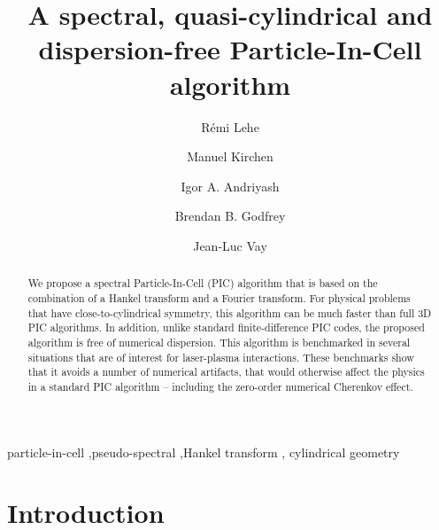\documentclass[1p,times]{elsarticle}
\title{A spectral, quasi-cylindrical and dispersion-free Particle-In-Cell algorithm}
\author[label1]{R\'emi {Lehe}}
\author[label2]{Manuel {Kirchen}}
\author[label3]{Igor A. {Andriyash}}
\author[label4]{Brendan B. {Godfrey}}
\author[label1]{Jean-Luc {Vay}}
\begin{document}
\begin{abstract}
We propose a spectral Particle-In-Cell (PIC) algorithm that is based 
on the combination of a Hankel transform and a Fourier transform. 
For physical problems that have close-to-cylindrical symmetry, this
algorithm can be much faster than full 3D PIC algorithms. In addition,
unlike standard finite-difference PIC codes, the proposed algorithm is free of numerical
dispersion. This algorithm is benchmarked in several situations that
are of interest for laser-plasma interactions. These
benchmarks show that it avoids a number of numerical artifacts, that
would otherwise affect the physics in a standard PIC algorithm -- 
including the zero-order numerical Cherenkov effect.
\end{abstract}

\begin{keyword}
particle-in-cell \sep pseudo-spectral \sep Hankel transform \sep
cylindrical geometry
\end{keyword}

\maketitle

\section*{Introduction}
\end{document}
